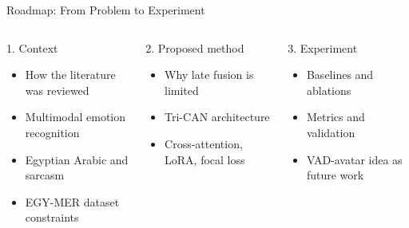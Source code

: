 \documentclass[aspectratio=169,10pt]{beamer}
\newcommand{\keytake}[1]{\vspace{0.3em}{\small #1}}
\begin{document}
\begin{frame}[t]{Roadmap: From Problem to Experiment}
\begin{columns}[T,onlytextwidth]
\begin{block}{1. Context}
\begin{itemize}
  \item How the literature was reviewed
  \item Multimodal emotion recognition
  \item Egyptian Arabic and sarcasm
  \item EGY-MER dataset constraints
\end{itemize}
\end{block}
\begin{block}{2. Proposed method}
\begin{itemize}
  \item Why late fusion is limited
  \item Tri-CAN architecture
  \item Cross-attention, LoRA, focal loss
\end{itemize}
\end{block}
\begin{block}{3. Experiment}
\begin{itemize}
  \item Baselines and ablations
  \item Metrics and validation
  \item VAD-avatar idea as future work
\end{itemize}
\end{block}
\end{columns}
\vspace{0.5cm}
\keytake{The question is whether letting the modalities interact helps with Egyptian Arabic sarcasm and cases where words and delivery disagree.}
\end{frame}
\end{document}
